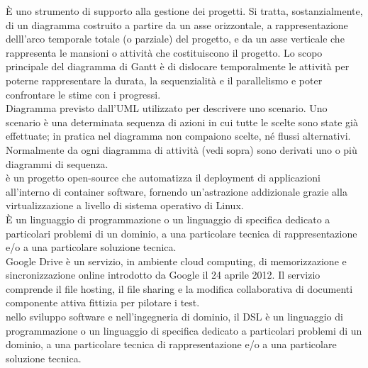 \documentclass{scalatekids-article}
\begin{document}
 È uno strumento di supporto alla gestione dei progetti.
Si tratta, sostanzialmente, di un diagramma costruito a partire da un asse orizzontale, a rappresentazione delll'arco temporale totale (o parziale) del progetto, e da un asse verticale che rappresenta le mansioni o attività che costituiscono il progetto.
Lo scopo principale del diagramma di Gantt è di dislocare temporalmente le attività per poterne rappresentare la durata, la sequenzialità e il parallelismo e poter confrontare le stime con i progressi.
\\

 Diagramma previsto dall'UML utilizzato per descrivere uno scenario.
Uno scenario è una determinata sequenza di azioni in cui tutte le scelte sono state già effettuate; in pratica nel diagramma non compaiono scelte, né flussi alternativi.
Normalmente da ogni diagramma di attività (vedi sopra) sono derivati uno o più diagrammi di sequenza.
\\

 è un progetto open-source che automatizza il deployment di applicazioni all'interno di container software, fornendo un'astrazione addizionale grazie alla virtualizzazione a livello di sistema operativo di Linux.
\\

 È un linguaggio di programmazione o un linguaggio di specifica dedicato a particolari problemi di un dominio, a una particolare tecnica di rappresentazione e/o a una particolare soluzione tecnica.
\\

 Google Drive è un servizio, in ambiente cloud computing, di memorizzazione e sincronizzazione online introdotto da Google il 24 aprile 2012. Il servizio comprende il file hosting, il file sharing e la modifica collaborativa di documenti
\\

 componente attiva fittizia per pilotare i test.
\\

 nello sviluppo software e nell'ingegneria di dominio, il DSL è un linguaggio di programmazione o un linguaggio di specifica dedicato a particolari problemi di un dominio, a una particolare tecnica di rappresentazione e/o a una particolare soluzione tecnica.
\\
\end{document}

